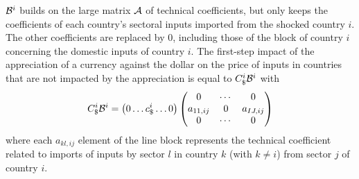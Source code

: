 \documentclass[11pt,a4paper]{paper} %
\begin{document}
${\cal B}^i$ builds on the large matrix ${\cal A}$ of technical coefficients, but only keeps the coefficients of each country's sectoral inputs imported from the shocked country $i$. The other coefficients are replaced by 0, including those of the block of country $i$ concerning the domestic inputs of country $i$. 
The first-step impact of the appreciation of a currency against the dollar on the price of inputs in countries that are not impacted by the appreciation is equal to $C_\$^i{\cal B}^i$ with
\begin{eqnarray}
C_\$^i{\cal B}^i=\left(0\ldots c_\$^i \ldots 0\right)\left(\begin{matrix}0&\cdots&0\\a_{11,ij}&0&a_{IJ,ij}\\0&\cdots&0\\\end{matrix}\right) 	
\label{eq:eq3}
\end{eqnarray}
where each $a_{kl,ij}$ element of the line block represents the technical coefficient related to imports of inputs by sector $l$ in country $k$ (with $k\ne i$) from sector $j$ of country $i$.\\
\end{document}

